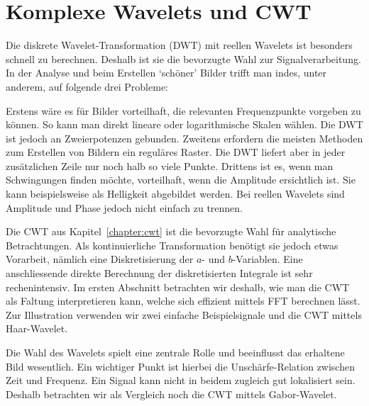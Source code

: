 %
%
%

\chapter{Komplexe Wavelets und CWT\label{chapter:complex}}
\begin{refsection}

Die diskrete Wavelet-Transformation (DWT) mit reellen Wavelets ist besonders schnell zu berechnen.
%
Deshalb ist sie die bevorzugte Wahl zur Signalverarbeitung.
In der Analyse und beim Erstellen `schöner' Bilder trifft man indes, unter anderem, auf folgende drei Probleme:

Erstens wäre es für Bilder vorteilhaft, die relevanten Frequenzpunkte vorgeben zu können.
So kann man direkt lineare oder logarithmische Skalen wählen. Die DWT ist jedoch an Zweierpotenzen gebunden. %
Zweitens erfordern die meisten Methoden zum Erstellen von Bildern ein reguläres Raster.
Die DWT liefert aber in jeder zusätzlichen Zeile nur noch halb so viele Punkte.
Drittens ist es, wenn man Schwingungen finden möchte, vorteilhaft, wenn die Amplitude ersichtlich ist.
Sie kann beispielsweise als Helligkeit abgebildet werden. 
Bei reellen Wavelets sind Amplitude und Phase jedoch nicht einfach zu trennen.

Die CWT aus Kapitel~\ref{chapter:cwt} ist die bevorzugte Wahl für analytische Betrachtungen.
Als kontinuierliche Transformation benötigt sie jedoch etwas Vorarbeit,
nämlich eine Diskretisierung der $a$- und $b$-Variablen.
Eine anschliessende direkte Berechnung der diskretisierten Integrale ist sehr rechenintensiv.
Im ersten Abschnitt betrachten wir deshalb, wie man die CWT als Faltung interpretieren kann, welche sich effizient mittels FFT berechnen lässt.
%
Zur Illustration verwenden wir zwei einfache Beispielsignale und die CWT mittels Haar-Wavelet.

Die Wahl des Wavelets spielt eine zentrale Rolle und beeinflusst das erhaltene Bild wesentlich.
Ein wichtiger Punkt ist hierbei die Unschärfe-Relation zwischen Zeit und Frequenz.
Ein Signal kann nicht in beidem zugleich gut lokalisiert sein.
Deshalb betrachten wir als Vergleich noch die CWT mittels Gabor-Wavelet.


\end{refsection}
